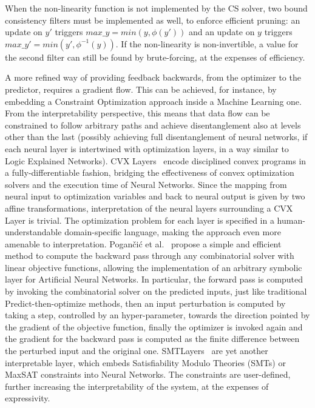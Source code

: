 When the non-linearity function is not implemented by the CS solver, two bound consistency filters must be implemented as well, to enforce efficient pruning: an update on $y'$ triggers $max\_y = min(y, \phi(y'))$ and an update on $y$ triggers $max\_y' = min(y', \phi^{-1}(y))$. If the non-linearity is non-invertible, a value for the second filter can still be found by brute-forcing, at the expenses of efficiency.
\fi

A more refined way of providing feedback backwards, from the optimizer to the predictor, requires a gradient flow. This can be achieved, for instance, by embedding a Constraint Optimization approach inside a Machine Learning one. 
From the interpretability perspective, this means that data flow can be constrained to follow arbitrary paths and achieve disentanglement also at levels other than the last (possibly achieving full disentanglement of neural networks, if each neural layer is intertwined with optimization layers, in a way similar to Logic Explained Networks).
%
CVX Layers~\cite{agrawal2019differentiable} encode disciplined convex programs in a fully-differentiable fashion, bridging the effectiveness of convex optimization solvers and the execution time of Neural Networks. Since the mapping from neural input to optimization variables and back to neural output is given by two affine transformations, interpretation of the neural layers surrounding a CVX Layer is trivial.
The optimization problem for each layer is specified in a human-understandable domain-specific language, making the approach even more amenable to interpretation.
%
Pogan\v{c}i\'c et al.~\cite{poganvcic2020differentiation} propose a simple and efficient method to compute the backward pass through any combinatorial solver with linear objective functions, allowing the implementation of an arbitrary symbolic layer for Artificial Neural Networks.
In particular, the forward pass is computed by invoking the combinatorial solver on the predicted inputs, just like traditional Predict-then-optimize methods, then an input perturbation is computed by taking a step, controlled by an hyper-parameter, towards the direction pointed by the gradient of the objective function, finally the optimizer is invoked again and the gradient for the backward pass is computed as the finite difference between the perturbed input and the original one.
%
SMTLayers~\cite{fredrikson2023learning} are yet another interpretable layer, which embeds Satisfiability Modulo Theories (SMTs) or MaxSAT constraints into Neural Networks. The constraints are user-defined, further increasing the interpretability of the system, at the expenses of expressivity.
